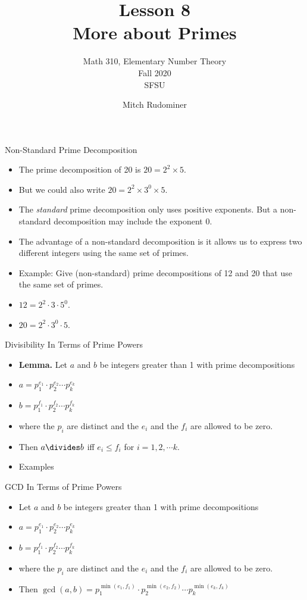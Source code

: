 \documentclass{beamer}
\title{Lesson 8 \\ More about Primes}
\subtitle{Math 310, Elementary Number Theory \\ Fall 2020 \\ SFSU}
\author{Mitch Rudominer}
\date{}
\begin{document}
\begin{frame}
  \titlepage
\end{frame}


\begin{frame}{Non-Standard Prime Decomposition}

\begin{itemize}
  \item The prime decomposition of 20 is $20 = 2^2 \times 5$.
  \item But we could also write $20 = 2^2 \times 3^0 \times 5$.
  \item The \emph{standard} prime decomposition only uses positive exponents.
  But a non-standard decomposition may include the exponent 0.
  \item The advantage of a non-standard decomposition is it allows us to express
  two different integers using the same set of primes.
  \item Example: Give (non-standard) prime decompositions of 12 and 20 that use the same set of primes.
  \item $12 = 2^2 \cdot 3 \cdot 5^0$.
  \item $20 = 2^2 \cdot 3^0 \cdot 5$.
\end{itemize}

\end{frame}

\begin{frame}{Divisibility In Terms of Prime Powers}

\begin{itemize}
  \item \textbf{Lemma.} Let $a$ and $b$ be integers greater than 1 with prime decompositions
  \item $a=p_1^{e_1} \cdot p_2^{e_2} \cdots p_k^{e_k}$
  \item $b=p_1^{f_1} \cdot p_2^{f_2} \cdots p_k^{f_k}$
  \item where the $p_i$ are distinct and the $e_i$ and the $f_i$ are allowed to be zero.
  \item Then $a\divides b$ iff $e_i \leq f_i$ for $i=1,2,\cdots k$.
  \item Examples
\end{itemize}

\end{frame}


\begin{frame}{GCD In Terms of Prime Powers}

\begin{itemize}
  \item Let $a$ and $b$ be integers greater than 1 with prime decompositions
  \item $a=p_1^{e_1} \cdot p_2^{e_2} \cdots p_k^{e_k}$
  \item $b=p_1^{f_1} \cdot p_2^{f_2} \cdots p_k^{f_k}$
  \item where the $p_i$ are distinct and the $e_i$ and the $f_i$ are allowed to be zero.
  \item Then $\gcd(a,b) = p_1^{\min(e_1,f_1)} \cdot p_2^{\min(e_2,f_2)} \cdots p_k^{\min(e_k,f_k)}$
\end{itemize}

\end{frame}
\end{document}
